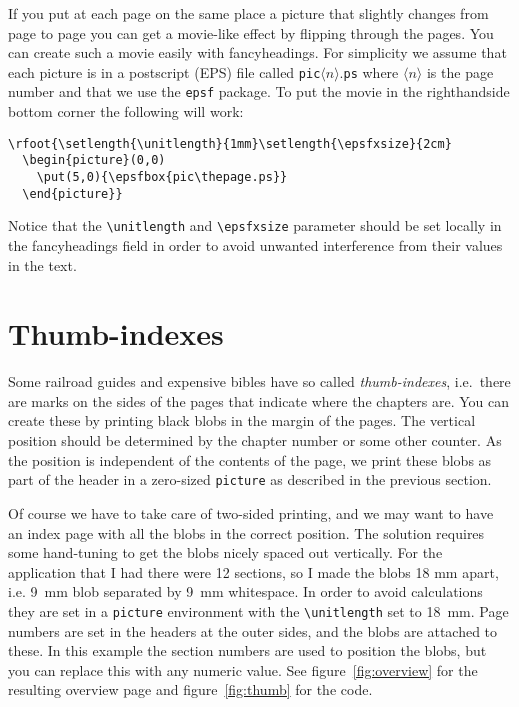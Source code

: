 \documentclass{article}
\makeatletter
\newcommand{\TTindex}[1]{\index{#1@\texttt{#1}}}
\makeatother
\begin{document}
\TTindex{picture}
If you put at each page on the same place a picture that slightly changes
from page to page you can get a movie-like effect by flipping through the
pages. You can create such a movie easily with fancyheadings. For
simplicity we assume that each picture is in a postscript (EPS) file called
\texttt{pic}$\langle n\rangle$.\texttt{ps} where $\langle n\rangle$ is the page number and that we use
the \texttt{epsf} package. 
\TTindex{epsf}
To put the movie in the  righthandside bottom corner the following will work:

\begin{verbatim}
\rfoot{\setlength{\unitlength}{1mm}\setlength{\epsfxsize}{2cm}
  \begin{picture}(0,0)
    \put(5,0){\epsfbox{pic\thepage.ps}}
  \end{picture}}
\end{verbatim}

Notice that the \verb|\unitlength| and \verb|\epsfxsize| parameter should
be set locally in the fancyheadings field in order to avoid unwanted
interference from their values in the text.

\section{Thumb-indexes}
\label{sec:thumb}

Some railroad guides and expensive bibles have so called
\emph{thumb-indexes}, i.e.\ there are marks on the sides of the pages that
indicate where the chapters are. You can create these by printing black
blobs in the margin of the pages. The vertical position should be
determined by the chapter number or some other counter. As the position is
independent of the contents of the page, we print these blobs as part of
the header in a zero-sized \texttt{picture} as described in the previous
section.

Of course we have to take care of two-sided printing, and we may want to
have an index page with all the blobs in the correct position. The solution
requires some hand-tuning to get the blobs nicely spaced out vertically.
For the application that I had there were 12 sections, so I made the blobs
18 mm apart, i.e. 9~mm blob separated by 9~mm whitespace. In order to avoid
calculations they are set in a \texttt{picture} environment with the
\verb|\unitlength| set to 18~mm. Page numbers are set in the headers at the
outer sides, and the blobs are attached to these. In this example the
section numbers are used to position the blobs, but you can replace this
with any numeric value. See figure~\ref{fig:overview} for the resulting
overview page and figure~\ref{fig:thumb} for the code.
\end{document}

